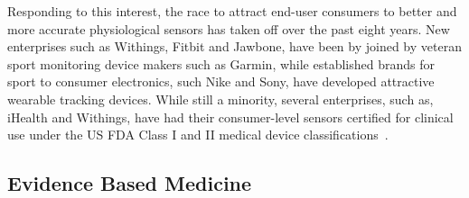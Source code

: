 \documentclass{sigchi}
\begin{document}


Responding to this interest, the race to attract end-user consumers to better and more accurate physiological sensors has taken off over the past eight years. New enterprises such as Withings, Fitbit and Jawbone, have been by joined by veteran sport monitoring device makers such as Garmin, while established brands for sport to consumer electronics, such Nike and Sony, have developed attractive wearable tracking devices.  While still a minority, several enterprises, such as, iHealth and Withings, have had their consumer-level sensors certified for clinical use under the US FDA Class I and II medical device classifications~\cite{timeline_2013}. 




\subsection{Evidence Based Medicine}%
\end{document}
